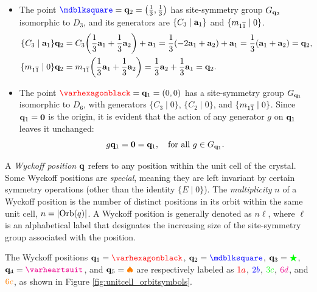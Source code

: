 \begin{example}
\begin{itemize}
\item The point $\textcolor{blue}{\mdblksquare} = \q_2 = \qty(\frac{1}{3}, \frac{1}{3})$ has site-symmetry group $G_{{\vb{q}}_2}$ isomorphic to $D_3$, and its generators are $\{C_3 \mid {\vb{a}}_1\}$ and $\{m_{1\overline{1}} \mid 0\}$.
\begin{align} \label{eq:site-symmetry-q2}
\{C_3 \mid {\vb{a}}_1\} {\vb{q}}_2 &= C_3 \qty(\frac{1}{3} {\vb{a}}_1 + \frac{1}{3} {\vb{a}}_2) + {\vb{a}}_1 = \frac{1}{3} \qty(-2{\vb{a}}_1 + {\vb{a}}_2) + {\vb{a}}_1 =
\frac{1}{3} ({\vb{a}}_1 + {\vb{a}}_2) = {\vb{q}}_2, \\
\{m_{1\overline{1}} \mid 0\} {\vb{q}}_2 &= m_{1\overline{1}} \qty(\frac{1}{3} {\vb{a}}_1 + \frac{1}{3} {\vb{a}}_2) =
\frac{1}{3} {\vb{a}}_2 + \frac{1}{3} {\vb{a}}_1 = {\vb{q}}_2.
\end{align}

\item The point \(\textcolor{red}{\varhexagonblack} = \q_1 = (0,0)\) has a site-symmetry group \(G_{{\vb{q}}_1}\) isomorphic to \(D_6\), with generators \(\{C_3 \mid 0\}\), \(\{C_2 \mid 0\}\), and \(\{m_{1\overline{1}} \mid 0\}\). Since \({\vb{q}}_1 = {\vb{0}}\) is the origin, it is evident that the action of any generator \(g\) on \({\vb{q}}_1\) leaves it unchanged:
\begin{equation} \label{eq:site-symmetry-q1}
g {\vb{q}}_1 = {\vb{0}} = {\vb{q}}_1, \quad \text{for all } g \in G_{{\vb{q}}_1}.
\end{equation}
\end{itemize}

\end{example}

\begin{definition} \label{def:wyckpos}
A \textit{Wyckoff position} \( {\vb{q}} \) refers to any position within the unit cell of the crystal. Some Wyckoff positions are \textit{special}, meaning they are left invariant by certain symmetry operations (other than the identity $\{E \mid 0\}$). The \textit{multiplicity} $n$ of a Wyckoff position is the number of distinct positions in its orbit within the same unit cell, $n = \abs{\text{Orb}(q)}$. A Wyckoff position is generally denoted as \( n\ell \), where \( \ell \) is an alphabetical label that designates the increasing size of the site-symmetry group associated with the position.
\end{definition}

\begin{example} \label{ex:wyckpos_q1q2q3q4q5}
The Wyckoff positions \( \q_1 = \textcolor{red}{\varhexagonblack} \), \( \q_2 = \textcolor{blue}{\mdblksquare} \), \( {\vb{q}}_3 = \textcolor{green}{\bigstar} \), \( \q_4 = \textcolor{magenta}{\varheartsuit} \), and \( {\vb{q}}_5 = \textcolor{orange}{\spadesuit} \) are respectively labeled as \( \textcolor{red}{1a} \), \( \textcolor{blue}{2b} \), \( \textcolor{green}{3c} \), \( \textcolor{magenta}{6d} \), and \( \textcolor{orange}{6e} \), as shown in Figure \ref{fig:unitcell_orbitsymbols}.
\end{example}

